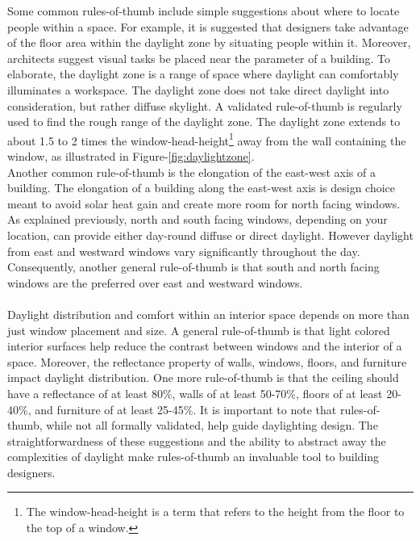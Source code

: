   Some common rules-of-thumb include simple suggestions about where to locate people within a space.
  For example, it is suggested that designers take advantage of the floor area within the daylight zone by situating people within it\cite{Leslie}.
  Moreover, architects suggest visual tasks be placed near the parameter of a building\cite{Leslie}.
  To elaborate, the daylight zone is a range of space where daylight can comfortably illuminates a workspace. 
  The daylight zone does not take direct daylight into consideration, but rather diffuse skylight.
  A validated rule-of-thumb is regularly used to find the rough range of the daylight zone\cite{reinhart2005simulation}. 
  The daylight zone extends to about 1.5 to 2 times the window-head-height\footnote{The window-head-height is a term that refers to the height from the floor to the top of a window.} away from the wall containing the window, as illustrated in Figure-\ref{fig:daylightzone}.
  \\

  Another common rule-of-thumb is the elongation of the east-west axis of a building.
  The elongation of a building along the east-west axis is design choice meant to avoid solar heat gain and create more room for north facing windows\cite{Leslie}.
  As explained previously, north and south facing windows, depending on your location, can provide either day-round diffuse or direct daylight.
  However daylight from east and westward windows vary significantly throughout the day.
  Consequently, another general rule-of-thumb is that south and north facing windows are the preferred over east and westward windows\cite{reinhart_lecture}.\\
  \\

  Daylight distribution and comfort within an interior space depends on more than just window placement and size.
  A general rule-of-thumb is that light colored interior surfaces help reduce the contrast between windows and the interior of a space\cite{Leslie}.
  Moreover, the reflectance property of walls, windows, floors, and furniture impact daylight distribution.
  One more rule-of-thumb is that the ceiling should have a reflectance of at least 80\%, walls of at least 50-70\%, floors of at least 20-40\%, and furniture of at least 25-45\%\cite{reinhart_lecture}.
  It is important to note that rules-of-thumb, while not all formally validated, help guide daylighting design.
  The straightforwardness of these suggestions and the ability to abstract away the complexities of daylight make rules-of-thumb an invaluable tool to building designers.
  \\

